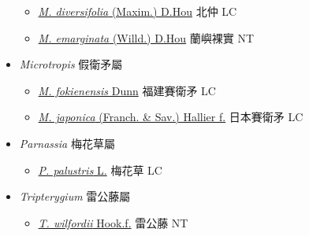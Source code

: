 \begin{itemize}
  \begin{itemize}
        \item[] \href{http://www.theplantlist.org/tpl1.1/search?q=Maytenus+diversifolia}{\textit{M. diversifolia} (Maxim.) D.Hou}   北仲   LC
        \item[] \href{http://www.theplantlist.org/tpl1.1/search?q=Maytenus+emarginata}{\textit{M. emarginata} (Willd.) D.Hou}   蘭嶼裸實   NT
  \end{itemize}
 \item[] \textit{Microtropis} 假衛矛屬
                                
  \begin{itemize}
        \item[] \href{http://www.theplantlist.org/tpl1.1/search?q=Microtropis+fokienensis}{\textit{M. fokienensis} Dunn}   福建賽衛矛   LC
        \item[] \href{http://www.theplantlist.org/tpl1.1/search?q=Microtropis+japonica}{\textit{M. japonica} (Franch. \& Sav.) Hallier f.}   日本賽衛矛   LC
  \end{itemize}
 \item[] \textit{Parnassia} 梅花草屬
                                
  \begin{itemize}
        \item[] \href{http://www.theplantlist.org/tpl1.1/search?q=Parnassia+palustris}{\textit{P. palustris} L.}   梅花草   LC
  \end{itemize}
 \item[] \textit{Tripterygium} 雷公藤屬
                                
  \begin{itemize}
        \item[] \href{http://www.theplantlist.org/tpl1.1/search?q=Tripterygium+wilfordii}{\textit{T. wilfordii} Hook.f.}   雷公藤   NT
  \end{itemize}
  \end{itemize}
